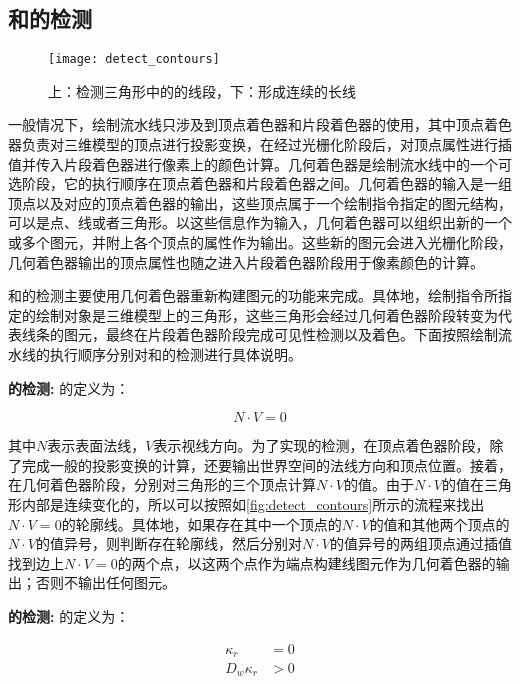 \subsection{\con{}和\scon{}的检测}

\begin{figure}[!t]
    \centering
    \texttt{[image: detect\_contours]}
    \caption[轮廓线的检测]{\label{fig:detect_contours}
    上：检测三角形中的\con{}的线段，下：形成连续的长线}
\end{figure}

一般情况下，绘制流水线只涉及到顶点着色器和片段着色器的使用，其中顶点着色器负责对三维模型的顶点进行投影变换，在经过光栅化阶段后，对顶点属性进行插值并传入片段着色器进行像素上的颜色计算。几何着色器是绘制流水线中的一个可选阶段，它的执行顺序在顶点着色器和片段着色器之间。几何着色器的输入是一组顶点以及对应的顶点着色器的输出，这些顶点属于一个绘制指令指定的图元结构，可以是点、线或者三角形。以这些信息作为输入，几何着色器可以组织出新的一个或多个图元，并附上各个顶点的属性作为输出。这些新的图元会进入光栅化阶段，几何着色器输出的顶点属性也随之进入片段着色器阶段用于像素颜色的计算。

和\scon{}的检测主要使用几何着色器重新构建图元的功能来完成。具体地，绘制指令所指定的绘制对象是三维模型上的三角形，这些三角形会经过几何着色器阶段转变为代表线条的图元，最终在片段着色器阶段完成可见性检测以及着色。下面按照绘制流水线的执行顺序分别对\con{}和\scon{}的检测进行具体说明。

\textbf{\con{}的检测:} \con{}的定义为：

\begin{equation}
    N\cdot{V} = 0
\end{equation}

其中$N$表示表面法线，$V$表示视线方向。为了实现\con{}的检测，在顶点着色器阶段，除了完成一般的投影变换的计算，还要输出世界空间的法线方向和顶点位置。接着，在几何着色器阶段，分别对三角形的三个顶点计算$N\cdot{V}$的值。由于$N\cdot{V}$的值在三角形内部是连续变化的，所以可以按照如\autoref{fig:detect_contours}所示的流程来找出$N\cdot{V} = 0$的轮廓线。具体地，如果存在其中一个顶点的$N\cdot{V}$的值和其他两个顶点的$N\cdot{V}$的值异号，则判断存在轮廓线，然后分别对$N\cdot{V}$的值异号的两组顶点通过插值找到边上$N\cdot{V} = 0$的两个点，以这两个点作为端点构建线图元作为几何着色器的输出；否则不输出任何图元。

\textbf{\scon{}的检测:} \scon{}的定义为：

\begin{align}
  \kappa_r &= 0 \label{eq:Kr0} \\
  D_w\kappa_r &> 0 \label{eq:DwKr0} 
\end{align}


